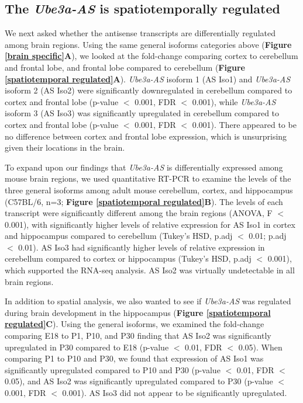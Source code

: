 \subsection{The \emph{Ube3a-AS} is spatiotemporally regulated}

We next asked whether the antisense transcripts are differentially regulated among brain regions. Using the same general isoforms categories above (\textbf{Figure \ref{brain specific}A}), we looked at the fold-change comparing cortex to cerebellum and frontal lobe, and frontal lobe compared to cerebellum (\textbf{Figure \ref{spatiotemporal regulated}A}). \textit{Ube3a-AS} isoform 1 (AS Iso1) and \textit{Ube3a-AS} isoform 2 (AS Iso2) were significantly downregulated in cerebellum compared to cortex and frontal lobe (p-value $<$ 0.001, FDR $<$ 0.001), while \textit{Ube3a-AS} isoform 3 (AS Iso3) was significantly upregulated in cerebellum compared to cortex and frontal lobe (p-value $<$ 0.001, FDR $<$ 0.001). There appeared to be no difference between cortex and frontal lobe expression, which is unsurprising given their locations in the brain.

To expand upon our findings that \textit{Ube3a-AS} is differentially expressed among mouse brain regions, we used quantitative RT-PCR to examine the levels of the three general isoforms among adult mouse cerebellum, cortex, and hippocampus (C57BL/6, n=3; \textbf{Figure \ref{spatiotemporal regulated}B}). The levels of each transcript were significantly different among the brain regions (ANOVA, F $<$ 0.001), with significantly higher levels of relative expression for AS Iso1 in cortex and hippocampus compared to cerebellum (Tukey's HSD, p.adj $<$ 0.01; p.adj $<$ 0.01). AS Iso3 had significantly higher levels of relative expression in cerebellum compared to cortex or hippocampus (Tukey's HSD, p.adj $<$ 0.001), which supported the RNA-seq analysis. AS Iso2 was virtually undetectable in all brain regions.

In addition to spatial analysis, we also wanted to see if \textit{Ube3a-AS} was regulated during brain development in the hippocampus (\textbf{Figure \ref{spatiotemporal regulated}C}). Using the general isoforms, we examined the fold-change comparing E18 to P1, P10, and P30 finding that AS Iso2 was significantly upregulated in P30 compared to E18 (p-value $<$ 0.01, FDR $<$ 0.05). When comparing P1 to P10 and P30, we found that expression of AS Iso1 was significantly upregulated compared to P10 and P30 (p-value $<$ 0.01, FDR $<$ 0.05), and AS Iso2 was significantly upregulated compared to P30 (p-value $<$ 0.001, FDR $<$ 0.001). AS Iso3 did not appear to be significantly upregulated. 

